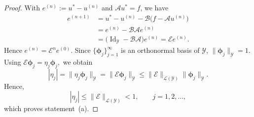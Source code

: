 \documentclass[preprint,numbers,sort&compress]{elsarticle}
\begin{document}
			\begin{proof}
				With $e^{(n)}:=u^\ast-u^{(n)}$ and $\mathcal A u^\ast=f$,
				we have
				\[
				\begin{aligned}
					e^{(n+1)}
					&=
					u^\ast-u^{(n)}
					-\mathcal B\bigl(f-\mathcal A u^{(n)}\bigr)\\
					&=
					e^{(n)}-\mathcal B\mathcal A e^{(n)}\\
					&=
					\bigl(\operatorname{Id}_{\mathcal Y}
					-\mathcal B\mathcal A\bigr)e^{(n)}
					=
					\mathcal E e^{(n)}.
				\end{aligned}
				\]
				Hence $e^{(n)}=\mathcal E^n e^{(0)}$.
				Since $\{\boldsymbol\phi_j\}_{j=1}^{\infty}$ is an orthonormal basis of $\mathcal Y$, $\|\boldsymbol\phi_j\|_{\mathcal Y}=1$. Using $\mathcal E\boldsymbol\phi_j
				=
				\eta_j\boldsymbol\phi_j,$
				we obtain
				\[
				|\eta_j|
				=
				\|\eta_j\boldsymbol\phi_j\|_{\mathcal Y}
				=
				\|\mathcal E\boldsymbol\phi_j\|_{\mathcal Y}
				\leq
				\|\mathcal E\|_{\mathcal L(\mathcal Y)}
				\|\boldsymbol\phi_j\|_{\mathcal Y}.
				\]
				Hence,
				\[
				|\eta_j|
				\leq
				\|\mathcal E\|_{\mathcal L(\mathcal Y)}
				<1,
				\qquad
				j=1,2,\ldots,
				\]
				which proves statement~(a).
				

\end{proof}
\end{document}
